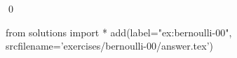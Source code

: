 
\begin{ex} 
  \label{ex:bernoulli-00}
  
  \qed
\end{ex} 
\begin{python0}
from solutions import *
add(label="ex:bernoulli-00",
    srcfilename='exercises/bernoulli-00/answer.tex') 
\end{python0}

